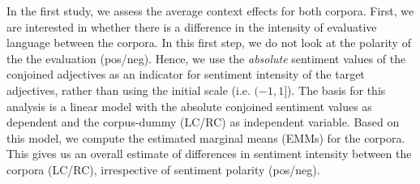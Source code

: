 \documentclass{article}
\begin{document}
In the first study, we assess the average context effects for both corpora. %
First, we are interested in whether there is a difference in the intensity of evaluative language between the corpora. In this first step, we do not look at the polarity of the the evaluation (pos/neg). Hence, we use the \textit{absolute} sentiment values of the conjoined adjectives as an indicator for sentiment intensity of the target adjectives, rather than using the initial scale (i.e. $(-1,1]$). The basis for this analysis is a linear model with the absolute conjoined sentiment values as dependent and the corpus-dummy (LC/RC) as independent variable. Based on this model, we compute the estimated marginal means (EMMs) for the corpora. This gives us an overall estimate of differences in sentiment intensity between the corpora (LC/RC), irrespective of sentiment polarity (pos/neg). 

\end{document}
